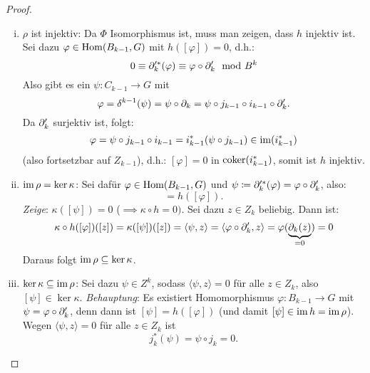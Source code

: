 \begin{proof}
  \begin{enumerate}[(i)]
    \item
      $\rho$ ist injektiv:
      Da $\Phi$ Isomorphismus ist, muss man zeigen, dass $h$ injektiv ist.
      Sei dazu $\varphi \in \mathrm{Hom}(B_{k-1},G)$ mit $h([\varphi]) = 0$, d.h.:
      \begin{equation*}
        0 \equiv \partial_{k}'^*(\varphi) \equiv \varphi \circ \partial_k' \mod B^k
      \end{equation*}
      Also gibt es ein $\psi \colon C_{k-1} \to G$ mit
      \begin{equation*}
        \varphi = \delta^{k-1}(\psi) = \psi \circ \partial_k = \psi \circ j_{k-1} \circ i_{k-1} \circ \partial_k'.
      \end{equation*}
      Da $\partial_k'$ surjektiv ist, folgt:
      \begin{equation*}
        \varphi = \psi \circ j_{k-1} \circ i_{k-1} = i_{k-1}^*(\psi \circ j_{k-1}) \in \operatorname{im}(i_{k-1}^*)
      \end{equation*}
      (also fortsetzbar auf $Z_{k-1}$), d.h.: $[\varphi] = 0$ in $\operatorname{coker}(i_{k-1}^*)$, somit ist $h$ injektiv.
    \item
      $\operatorname{im} \rho = \ker \kappa$:
      Sei dafür $\varphi \in \mathrm{Hom}(B_{k-1},G)$ und $\psi \coloneqq \partial_{k}'^* (\varphi) = \varphi \circ \partial_k'$, also:
      \begin{equation*}
        [\psi] = h([\varphi]).
      \end{equation*}
      \emph{Zeige}: $\kappa([\psi]) = 0$ ($\implies \kappa \circ h = 0)$.
      Sei dazu $z \in Z_k$ beliebig.
      Dann ist:
      \begin{equation*}
        \kappa \circ h ([\varphi])([z]) = \kappa([\psi])([z]) = \langle \psi, z \rangle = \langle \varphi \circ \partial_k', z \rangle = \varphi(\underbrace{\partial_k(z)}_{= 0}) = 0
      \end{equation*}
      Daraus folgt $\operatorname{im} \rho \subseteq \ker \kappa$.
    \item
      $\ker \kappa \subseteq \operatorname{im} \rho$:
      Sei dazu $\psi \in Z^k$, sodass $\langle \psi, z \rangle = 0$ für alle $z \in Z_k$, also $[\psi] \in \ker \kappa$.
      \emph{Behauptung}: Es existiert Homomorphismus $\varphi \colon B_{k-1} \to G$  mit $\psi = \varphi \circ \partial_k'$, denn dann ist $[\psi] = h([\varphi])$ (und damit $[\psi] \in \operatorname{im} h = \operatorname{im} \rho$).
      Wegen $\langle \psi, z \rangle = 0$ für alle $z \in Z_k$ ist
      \begin{equation*}
        j_k^*(\psi) = \psi \circ j_k = 0.

\end{equation*}
\end{enumerate}
\end{proof}
